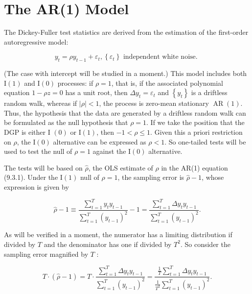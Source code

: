\documentclass[10pt]{article}
\begin{document}
\section*{The AR(1) Model}
The Dickey-Fuller test statistics are derived from the estimation of the first-order autoregressive model:


\begin{equation*}
y_{t}=\rho y_{t-1}+\varepsilon_{t},\left\{\varepsilon_{t}\right\} \text { independent white noise. } \tag{9.3.1}
\end{equation*}


(The case with intercept will be studied in a moment.) This model includes both $\mathrm{I}(1)$ and $\mathrm{I}(0)$ processes: if $\rho=1$, that is, if the associated polynomial equation $1-\rho z=0$ has a unit root, then $\Delta y_{t}=\varepsilon_{t}$ and $\left\{y_{t}\right\}$ is a driftless random walk, whereas if $|\rho|<1$, the process is zero-mean stationary $\operatorname{AR}(1)$. Thus, the hypothesis that the data are generated by a driftless random walk can be formulated as the null hypothesis that $\rho=1$. If we take the position that the DGP is either I $(0)$ or $\mathrm{I}(1)$, then $-1<\rho \leq 1$. Given this a priori restriction on $\rho$, the $\mathrm{I}(0)$ alternative can be expressed as $\rho<1$. So one-tailed tests will be used to test the null of $\rho=1$ against the $\mathrm{I}(0)$ alternative.

The tests will be based on $\hat{\rho}$, the OLS estimate of $\rho$ in the AR(1) equation (9.3.1). Under the $\mathrm{I}(1)$ null of $\rho=1$, the sampling error is $\hat{\rho}-1$, whose expression is given by


\begin{equation*}
\hat{\rho}-1 \equiv \frac{\sum_{t=1}^{T} y_{t} y_{t-1}}{\sum_{t=1}^{T}\left(y_{t-1}\right)^{2}}-1=\frac{\sum_{t=1}^{T} \Delta y_{t} y_{t-1}}{\sum_{t=1}^{T}\left(y_{t-1}\right)^{2}} . \tag{9.3.2}
\end{equation*}


As will be verified in a moment, the numerator has a limiting distribution if divided by $T$ and the denominator has one if divided by $T^{2}$. So consider the sampling error magnified by $T$ :


\begin{equation*}
T \cdot(\hat{\rho}-1)=T \cdot \frac{\sum_{t=1}^{T} \Delta y_{t} y_{t-1}}{\sum_{t=1}^{T}\left(y_{t-1}\right)^{2}}=\frac{\frac{1}{T} \sum_{t=1}^{T} \Delta y_{t} y_{t-1}}{\frac{1}{T^{2}} \sum_{t=1}^{T}\left(y_{t-1}\right)^{2}} . \tag{9.3.3}
\end{equation*}
\end{document}
